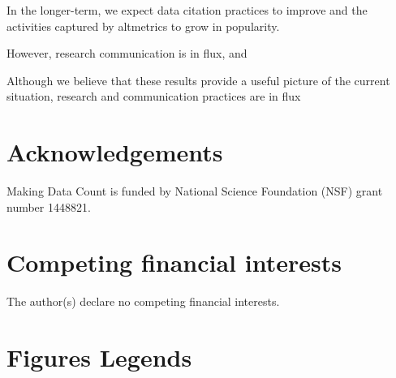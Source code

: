 \documentclass[english]{article}
\begin{document}
In the longer-term, we expect data citation practices to improve and the activities captured by altmetrics to grow in popularity.

However, research communication is in flux, and 


Although we believe that these results provide a useful picture of the current situation, research and communication practices are in flux


\section*{Acknowledgements}

Making Data Count is funded by National Science Foundation (NSF) grant number 1448821.


\section*{Competing financial interests}


The author(s) declare no competing financial interests.


\section*{Figures Legends}


\end{document}
